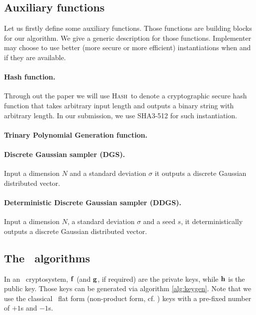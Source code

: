 \documentclass{llncs}
\newcommand{\bff}{{\bf f}}
\newcommand{\bfg}{{\bf g}}
\newcommand{\bfh}{{\bf h}}
\newcommand{\ntru}{{\sf{NTRU}}}
\newcommand{\ntrukem}{{\sf{ntru-kem}}}
\newcommand{\hash}{{\textsc{Hash}}}
\newcommand{\<}{\langle}
\renewcommand{\>}{\rangle}
\begin{document}
\subsection{Auxiliary functions}
Let us firstly define some auxiliary functions. Those functions are building blocks for our algorithm.
We give a generic description for those functions.
Implementer may choose to use better (more secure
or more efficient) instantiations when and if they
are available.

\paragraph{Hash function.} Through out the paper
we will use \hash~to denote a cryptographic secure hash function that takes arbitrary input length and
outputs a binary string with arbitrary length. In
our submission, we use \textsf{SHA3-512} for such
instantiation.


\paragraph{Trinary Polynomial Generation function.}

\paragraph{Discrete Gaussian sampler (DGS).} Input a
dimension $N$ and a standard deviation $\sigma$ it outputs a discrete Gaussian distributed vector.

\paragraph{Deterministic Discrete Gaussian sampler (DDGS).}Input a
dimension $N$, a standard deviation $\sigma$ and
a seed $s$, it deterministically outputs a discrete Gaussian distributed vector.
\subsection{The \ntrukem~algorithms}

In an \ntru~cryptosystem, $\bff$ (and $\bfg$, if
required) are 
the private keys, while $\bfh$ is the public key.
Those keys can be generated via algorithm
\ref{alg:keygen}.
Note that we use the classical \ntru~flat form (non-product form, cf. \cite{DBLP:journals/iacr/HoffsteinPSSWZ15}) keys 
with a pre-fixed number of $+1$s and $-1$s.
\end{document}
